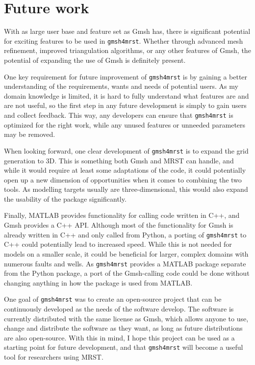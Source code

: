 \section{Future work}
\label{sec:Future}
With as large user base and feature set as Gmsh has, there is significant potential for exciting features to be used in \verb|gmsh4mrst|. Whether through advanced mesh refinement, improved triangulation algorithms, or any other features of Gmsh, the potential of expanding the use of Gmsh is definitely present.

One key requirement for future improvement of \verb|gmsh4mrst| is by gaining a better understanding of the requirements, wants and needs of potential users. As my domain knowledge is limited, it is hard to fully understand what features are and are not useful, so the first step in any future development is simply to gain users and collect feedback. This way, any developers can ensure that \verb|gmsh4mrst| is optimized for the right work, while any unused features or unneeded parameters may be removed.

When looking forward, one clear development of \verb|gmsh4mrst| is to expand the grid generation to 3D. This is something both Gmsh and MRST can handle, and while it would require at least some adaptations of the code, it could potentially open up a new dimension of opportunities when it comes to combining the two tools. As modelling targets usually are three-dimensional, this would also expand the usability of the package significantly.

Finally, MATLAB provides functionality for calling code written in C++, and Gmsh provides a C++ API. Although most of the functionality for Gmsh is already written in C++ and only called from Python, a porting of \verb|gmsh4mrst| to C++ could potentially lead to increased speed. While this is not needed for models on a smaller scale, it could be beneficial for larger, complex domains with numerous faults and wells. As \verb|gmsh4mrst| provides a MATLAB package separate from the Python package, a port of the Gmsh-calling code could be done without changing anything in how the package is used from MATLAB.

One goal of \verb|gmsh4mrst| was to create an open-source project that can be continuously developed as the needs of the software develop. The software is currently distributed with the same license as Gmsh, which allows anyone to use, change and distribute the software as they want, as long as future distributions are also open-source. With this in mind, I hope this project can be used as a starting point for future development, and that \verb|gmsh4mrst| will become a useful tool for researchers using MRST.
